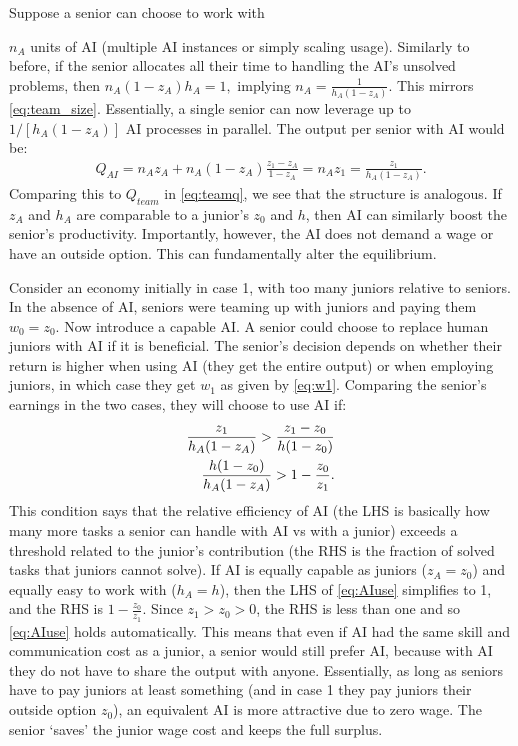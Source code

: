 \documentclass[12pt]{article}
\begin{document}
Suppose a senior can choose to work with {\(n_A\) units of AI (multiple AI instances or simply scaling usage). Similarly to before, if the senior allocates all their time to handling the AI's unsolved problems, then \(n_A (1 - z_A) h_A = 1,\) implying \(n_A = \frac{1}{h_A(1-z_A)}.\) This mirrors \eqref{eq:team_size}. Essentially, a single senior can now leverage up to \(1/[h_A(1-z_A)]\) AI processes in parallel. The output per senior with AI would be: 
\begin{align}\label{eq:aiq}
Q_{AI} = n_A z_A + n_A (1-z_A)\frac{z_1-z_A}{1-z_A} = n_A z_1 = \frac{z_1}{h_A(1-z_A)}.
\end{align}
Comparing this to $Q_{team}$ in \eqref{eq:teamq}, we see that the structure is analogous. If \(z_A\) and \(h_A\) are comparable to a junior's $z_0$ and $h$, then AI can similarly boost the senior's productivity. Importantly, however, the AI does not demand a wage or have an outside option. This can fundamentally alter the equilibrium.

Consider an economy initially in case 1, with too many juniors relative to seniors. In the absence of AI, seniors were teaming up with juniors and paying them $w_0 = z_0$. Now introduce a capable AI. A senior could choose to replace human juniors with AI if it is beneficial. The senior's decision depends on whether their return is higher when using AI (they get the entire output) or when employing juniors, in which case they get $w_1$ as given by \eqref{eq:w1}. Comparing the senior's earnings in the two cases, they will choose to use AI if:
\begin{align}\notag
\frac{z_1}{h_A(1-z_A)} > \frac{z_1-z_0}{h(1-z_0)} \\
\label{eq:AIuse}
\frac{h(1-z_0)}{h_A(1-z_A)} > 1- \frac{z_0}{z_1}. 
\end{align}
This condition says that the relative efficiency of AI (the LHS is basically how many more tasks a senior can handle with AI vs with a junior) exceeds a threshold related to the junior's contribution (the RHS is the fraction of solved tasks that juniors cannot solve). If AI is equally capable as juniors (\(z_A = z_0\)) and equally easy to work with (\(h_A = h\)), then the LHS of \eqref{eq:AIuse} simplifies to 1, and the RHS is \(1 - \frac{z_0}{z_1}\). Since \(z_1 > z_0>0\), the RHS is less than one and so \eqref{eq:AIuse} holds automatically. This means that even if AI had the same skill and communication cost as a junior, a senior would still prefer AI, because with AI they do not have to share the output with anyone. Essentially, as long as seniors have to pay juniors at least something (and in case 1 they pay juniors their outside option \(z_0\)), an equivalent AI is more attractive due to zero wage. The senior `saves' the junior wage cost and keeps the full surplus.

}
\end{document}

